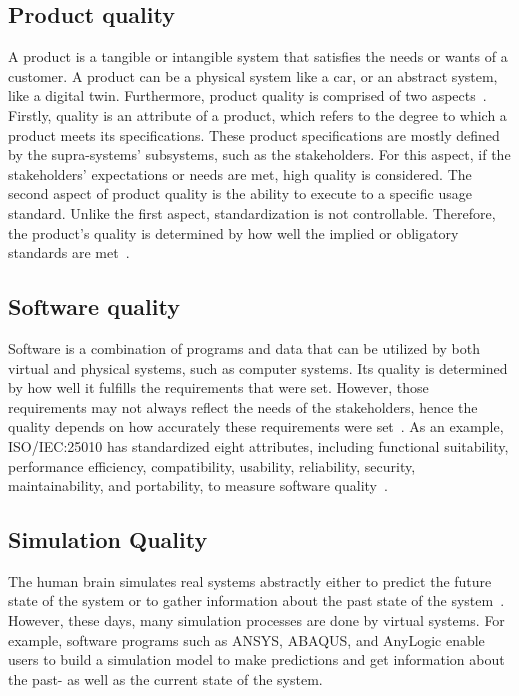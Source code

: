 \documentclass{llncs}
\begin{document}
    \subsection{Product quality}
    A product is a tangible or intangible system that satisfies the needs or wants of a customer. A product can be a physical system like a car, or an abstract system, like a digital twin. Furthermore, 
    product quality is comprised of two aspects~\cite{GrievesPLMBook}.  
    Firstly, quality is an attribute of a product, which refers to the degree to which a product meets its specifications. These product specifications are mostly defined by the supra-systems' subsystems, such as the stakeholders.
    For this aspect, if the stakeholders' expectations or needs are met,  high quality is considered. The second aspect of product quality is the ability to execute to a specific usage standard.
    Unlike the first aspect, standardization is not controllable. Therefore, the product's quality is determined by how well the implied or obligatory standards are met~\cite{GrievesPLMBook}.

    \subsection{Software quality}
    Software is a combination of programs and data that can be utilized by both virtual and physical systems, 
    such as computer systems\cite{OxfordDictionary}. Its quality is determined by how well it fulfills the requirements that were set. However, 
    those requirements may not always reflect the needs of the stakeholders, hence the quality depends on how accurately these requirements were set~\cite{IEE730-2014}. 
    As an example, ISO/IEC:25010 has standardized eight attributes, 
    including functional suitability, performance efficiency, compatibility, usability, reliability, security, maintainability, and portability, to measure software quality~\cite{ISO/IEC:25010}.
    
    \subsection{Simulation Quality}
    The human brain simulates real systems abstractly either to predict the future state of the system or to gather information about the past state of the system~\cite{MobusSystemTheory}.
    However, these days, many simulation processes are done by virtual systems. For example, software programs such as ANSYS\cite{Ansys}, ABAQUS\cite{Abaqus}, and AnyLogic\cite{AnyLogic} enable users 
    to build a simulation model to make predictions and get information about the past- as well as the current state of the system.  
    
\end{document}
